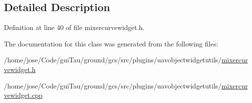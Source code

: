 \subsection{Detailed Description}


Definition at line 40 of file mixercurvewidget.\-h.



The documentation for this class was generated from the following files\-:\begin{DoxyCompactItemize}
\item 
/home/jose/\-Code/gui\-Tau/ground/gcs/src/plugins/uavobjectwidgetutils/\hyperlink{mixercurvewidget_8h}{mixercurvewidget.\-h}\item 
/home/jose/\-Code/gui\-Tau/ground/gcs/src/plugins/uavobjectwidgetutils/\hyperlink{mixercurvewidget_8cpp}{mixercurvewidget.\-cpp}\end{DoxyCompactItemize}
